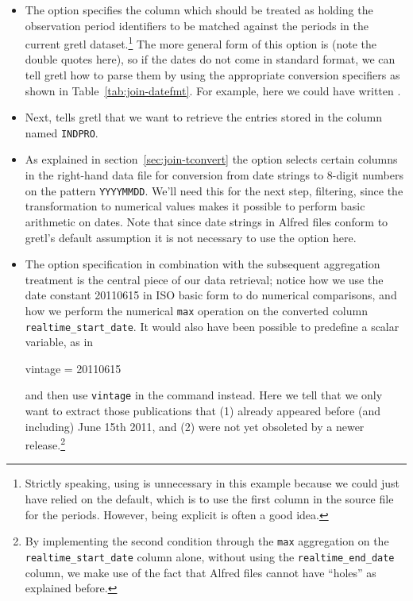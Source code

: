 \begin{itemize}
\item The  option specifies the column which should be
  treated as holding the observation period identifiers to be matched
  against the periods in the current gretl dataset.\footnote{Strictly
    speaking, using  is unnecessary in this example
    because we could just have relied on the default, which is to use
    the first column in the source file for the periods. However,
    being explicit is often a good idea.}  The more general form of
  this option is  (note the double
  quotes here), so if the dates do not come in standard format, we can
  tell gretl how to parse them by using the appropriate conversion
  specifiers as shown in Table~\ref{tab:join-datefmt}.  For example,
  here we could have written
  .
\item Next,  tells gretl that we want to
  retrieve the entries stored in the column named \texttt{INDPRO}.
\item As explained in section~\ref{sec:join-tconvert} the
   option selects certain columns in the right-hand
  data file for conversion from date strings to 8-digit numbers on the
  pattern \texttt{YYYYMMDD}.  We'll need this for the next step,
  filtering, since the transformation to numerical values makes it
  possible to perform basic arithmetic on dates.  Note that since
  date strings in Alfred files conform to gretl's default assumption
  it is not necessary to use the  option here.
\item The  option specification in combination with the 
  subsequent  aggregation treatment is the central piece of
  our data retrieval; notice how we use the date constant 20110615 in
  ISO basic form to do numerical comparisons, and how we perform the 
  numerical \texttt{max} operation on the converted column 
  \verb|realtime_start_date|. It would also have been possible to 
  predefine a scalar variable, as in
 \begin{code}
   vintage = 20110615
 \end{code}
  and then use \texttt{vintage} in the  command instead.
  Here we tell  that we only want to extract those
  publications that (1) already appeared before (and including) June 15th 2011, and
  (2) were not yet obsoleted by a newer release.\footnote{By implementing 
  the second condition through the \texttt{max} aggregation on the 
  \verb|realtime_start_date| column alone, without using the 
  \verb|realtime_end_date| column, we make use of the fact that Alfred
  files cannot have ``holes'' as explained before.}
\end{itemize}

